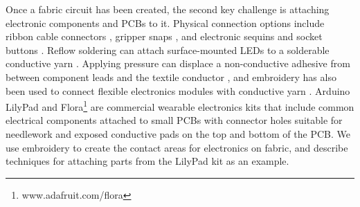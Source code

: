 Once a fabric circuit has been created, the second key challenge is attaching electronic components and PCBs to it.
Physical connection options include ribbon cable connectors \cite{lehn2004tags}, gripper snaps \cite{5387040}, and electronic sequins and socket buttons \cite{Buechley2009}. Reflow soldering can attach surface-mounted LEDs to a solderable conductive yarn \cite{Berglund:2015:SCA:2802083.2808413, Molla:2017:SME:3123021.3123058}. Applying pressure can displace a non-conductive adhesive from between component leads and the textile conductor \cite{linz2012contacting}, and embroidery has also been used to connect flexible electronics modules with conductive yarn \cite{linz2005embroidering}. Arduino LilyPad \cite{4487082} and Flora\footnote{www.adafruit.com/flora} are commercial wearable electronics kits that include common electrical components attached to small PCBs with connector holes suitable for needlework and exposed conductive pads on the top and bottom of the PCB. We use embroidery to create the contact areas for electronics on fabric, and describe techniques for attaching parts from the LilyPad kit as an example.


